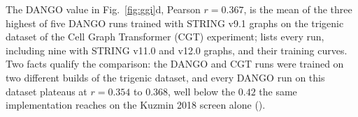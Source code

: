 \clearpage
{}

The DANGO value in Fig.~\ref{fig:ggi}d, Pearson $r = 0.367$, is the mean of the three
highest of five DANGO runs trained with STRING v9.1 graphs on the trigenic dataset of the
Cell Graph Transformer (CGT) experiment;  lists every run,
including nine with STRING v11.0 and v12.0 graphs, and  their
training curves. Two facts qualify the comparison: the DANGO and CGT runs were trained on
two different builds of the trigenic dataset, and every DANGO run on this dataset plateaus
at $r = 0.354$ to $0.368$, well below the $0.42$ the same implementation reaches on the
Kuzmin 2018 screen alone ().

